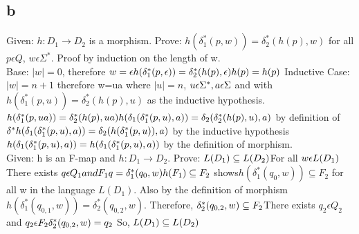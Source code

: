 \documentclass[12pt]{article}
\begin{document}
\subsection*{b}
Given: $h: D_1 \rightarrow D_2$ is a morphism. 
Prove: $h( \delta_1^\ast (p,w))= \delta_2^\ast (h(p),w)$ for all $p \epsilon Q$, $w \epsilon \Sigma^\ast $. Proof by induction on the length of w. \\
Base: $|w|=0$, therefore $w= \epsilon \\
h( \delta_1^\ast (p, \epsilon ))= \delta_2^\ast (h(p), \epsilon ) \\
h(p)=h(p) \\ $
Inductive Case: $|w|=n+1$ therefore w=ua where $|u|=n$, $u \epsilon \Sigma^\ast , a \epsilon \Sigma \\ $
and with $h( \delta_1^\ast(p,u))= \delta_2^\ast (h(p),u)$ as the inductive hypothesis. $ \\
h( \delta_1^\ast(p,ua))= \delta_2^\ast (h(p),ua) \\
h( \delta_1 (\delta_1^\ast(p,u), a))= \delta_2 ( \delta_2^\ast (h(p),u),a)$ by definition of $ \delta^\ast \\
h( \delta_1 (\delta_1^\ast(p,u), a))= \delta_2 (h( \delta_1^\ast (p,u)),a)$ by the inductive hypothesis $ \\
h( \delta_1 (\delta_1^\ast(p,u), a))= h( \delta_1 ( \delta_1^\ast (p,u),a))$ by the definition of morphism. \\

Given: h is an F-map and $h: D_1 \rightarrow D_2$. Prove: $L(D_1) \subseteq L(D_2) \\
$For all $w \epsilon L(D_1) \\
$There exists $q \epsilon Q_1 and F_1 \\
q= \delta_1^\ast (q_0 , w) \\
h(F_1) \subseteq F_2$ shows$
h( \delta_1^\ast (q_0 , w)) \subseteq F_2 $ for all w in the language $L(D_1)$. Also by the definition of morphism $
h( \delta_1^\ast (q_{0,1} , w)) = \delta_2^\ast (q_{0,2} , w) $. Therefore, $\\
\delta_2^\ast (q_{0,2} , w) \subseteq F_2 \\
$There exists $q_2 \epsilon Q_2 $ and $q_2 \epsilon F_2 \\
\delta_2^\ast (q_{0,2} , w) = q_2$ So, $\\
L(D_1) \subseteq L(D_2) \\ $
\end{document}
